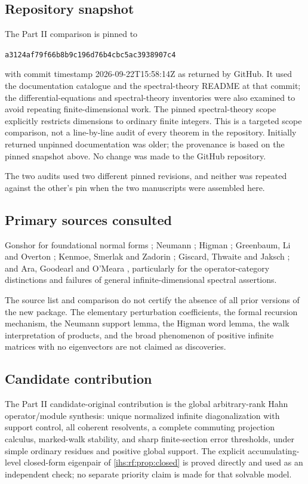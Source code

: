 \documentclass[11pt,a4paper]{article}
\numberwithin{equation}{section}
\theoremstyle{definition}
\theoremstyle{remark}
\newcommand{\commitB}{a3124af79f66b8b9c196d76b4cbc5ac3938907c4}
\begin{document}
\subsection{Repository snapshot}\label{ihs:app:snapshotB}
The Part II comparison is pinned to
\begin{center}\small\texttt{\commitB}\end{center}
with commit timestamp 2026-09-22T15:58:14Z as returned by GitHub. It used
the documentation catalogue and the spectral-theory README at that commit;
the differential-equations and spectral-theory inventories were also
examined to avoid repeating finite-dimensional work. The pinned
spectral-theory scope explicitly restricts dimensions to ordinary finite
integers. This is a targeted scope comparison, not a line-by-line audit of
every theorem in the repository. Initially returned unpinned documentation
was older; the provenance is based on the pinned snapshot above. No change
was made to the GitHub repository.

The two audits used two different pinned revisions, and neither was repeated
against the other's pin when the two manuscripts were assembled here.

\subsection{Primary sources consulted}\label{ihs:app:sourcesB}
Gonshor for foundational normal forms \cite{Gonshor}; Neumann
\cite{Neumann}; Higman \cite{Higman}; Greenbaum, Li and Overton \cite{glo};
Kenmoe, Smerlak and Zadorin \cite{ksz}; Giscard, Thwaite and Jaksch
\cite{pathsum}; and Ara, Goodearl and O'Meara \cite{ago}, particularly for
the operator-category distinctions and failures of general
infinite-dimensional spectral assertions.

The source list and comparison do not certify the absence of all prior
versions of the new package. The elementary perturbation coefficients, the
formal recursion mechanism, the Neumann support lemma, the Higman word
lemma, the walk interpretation of products, and the broad phenomenon of
positive infinite matrices with no eigenvectors are not claimed as
discoveries.

\subsection{Candidate contribution}\label{ihs:app:candidateB}
The Part II candidate-original contribution is the global arbitrary-rank
Hahn operator/module synthesis: unique normalized infinite diagonalization
with support control, all coherent resolvents, a complete commuting
projection calculus, marked-walk stability, and sharp finite-section error
thresholds, under simple ordinary residues and positive global support. The
explicit accumulating-level closed-form eigenpair of
\cref{ihs:rf:prop:closed} is proved directly and used as an independent
check; no separate priority claim is made for that solvable model.
\end{document}

